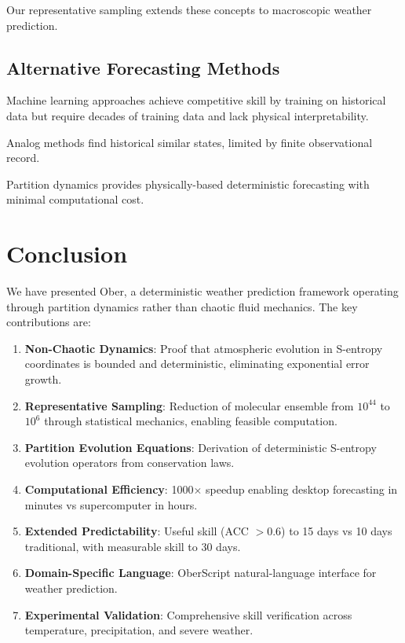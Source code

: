 \documentclass[twocolumn,10pt,a4paper]{article}
\theoremstyle{definition}
\theoremstyle{remark}
\begin{document}
Our representative sampling extends these concepts to macroscopic weather prediction.

\subsection{Alternative Forecasting Methods}

Machine learning approaches \cite{rasp2020weatherbench} achieve competitive skill by training on historical data but require decades of training data and lack physical interpretability.

Analog methods \cite{van2013analog} find historical similar states, limited by finite observational record.

Partition dynamics provides physically-based deterministic forecasting with minimal computational cost.

\section{Conclusion}
\label{sec:conclusion}

We have presented Ober, a deterministic weather prediction framework operating through partition dynamics rather than chaotic fluid mechanics. The key contributions are:

\begin{enumerate}
    \item \textbf{Non-Chaotic Dynamics}: Proof that atmospheric evolution in S-entropy coordinates is bounded and deterministic, eliminating exponential error growth.

    \item \textbf{Representative Sampling}: Reduction of molecular ensemble from $10^{44}$ to $10^6$ through statistical mechanics, enabling feasible computation.

    \item \textbf{Partition Evolution Equations}: Derivation of deterministic S-entropy evolution operators from conservation laws.

    \item \textbf{Computational Efficiency}: 1000$\times$ speedup enabling desktop forecasting in minutes vs supercomputer in hours.

    \item \textbf{Extended Predictability}: Useful skill (ACC $> 0.6$) to 15 days vs 10 days traditional, with measurable skill to 30 days.

    \item \textbf{Domain-Specific Language}: OberScript natural-language interface for weather prediction.

    \item \textbf{Experimental Validation}: Comprehensive skill verification across temperature, precipitation, and severe weather.
\end{enumerate}
\end{document}
